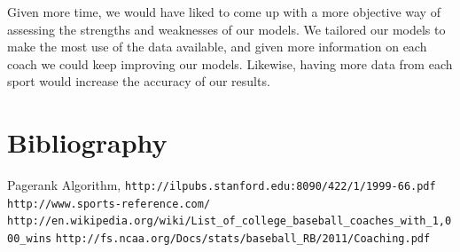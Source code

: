 \documentclass[11pt,notitlepage]{article}
\begin{document}
Given more time, we would have liked to come up with a more objective way of assessing the strengths and weaknesses of our models. We tailored our models to make the most use of the data available, and given more information on each coach we could keep improving our models. Likewise, having more data from each sport would increase the accuracy of our results.


\pagebreak

\section{Bibliography}
\begin{thebibliography}{9}

 Pagerank Algorithm,
\verb|http://ilpubs.stanford.edu:8090/422/1/1999-66.pdf|
\verb|http://www.sports-reference.com/|
\verb|http://en.wikipedia.org/wiki/List_of_college_baseball_coaches_with_1,000_wins|
\verb|http://fs.ncaa.org/Docs/stats/baseball_RB/2011/Coaching.pdf|


\end{thebibliography}
\end{document}
